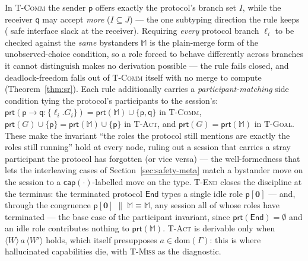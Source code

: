 \documentclass{article}
\theoremstyle{plain}
\theoremstyle{definition}
\newcommand{\dom}{\mathrm{dom}}
\newcommand{\MM}{\mathbb{M}}
\newcommand{\ppar}{\;\|\;}
\newcommand{\cp}[1]{\mathsf{cap}(#1)}
\newcommand{\prt}[1]{\mathsf{prt}(#1)}
\newcommand{\set}[1]{\{#1\}}
\newcommand{\End}{\mathsf{End}}
\begin{document}
In \textsc{T-Comm} the sender $\mathsf p$ offers exactly
the protocol's branch set $I$, while the receiver $\mathsf q$ may accept
\emph{more} ($I\subseteq J$) --- the one subtyping direction the rule keeps
(%
safe interface slack at the receiver). Requiring \emph{every}
protocol branch $\ell_i$ to be checked against the \emph{same} bystanders $\MM$
is the plain-merge form of the unobserved-choice condition, so a role forced to behave
differently across branches it cannot distinguish makes no derivation possible
--- the rule fails closed, and deadlock-freedom falls out of \textsc{T-Comm}
itself with no merge to compute (Theorem~\ref{thm:sr}). Each rule additionally
carries a \emph{participant-matching} side condition tying the protocol's
participants to the session's: $\prt{\mathsf p{\to}\mathsf q:\{\ell_i.G_i\}}
=\prt\MM\cup\set{\mathsf p,\mathsf q}$ in \textsc{T-Comm},
$\prt G\cup\set{\mathsf p}=\prt\MM\cup\set{\mathsf p}$ in \textsc{T-Act}, and
$\prt G=\prt\MM$ in \textsc{T-Goal}. These make the invariant ``the roles the
protocol still mentions are exactly the roles still running'' hold at every node,
ruling out a session that carries a stray participant the protocol has forgotten
(or vice versa) --- the well-formedness that lets the interleaving cases of
Section~\ref{sec:safety-meta}
match a bystander move on the session to a $\cp{\cdot}$-labelled move on the type.
\textsc{T-End} closes the discipline at the terminus: the terminated protocol
$\End$ types a single idle role $\mathsf p[\mathbf 0]$ --- and, through the
congruence $\mathsf p[\mathbf 0]\ppar\MM\equiv\MM$, any session all of whose
roles have terminated --- the base case of the participant invariant, since
$\prt\End=\emptyset$ and an idle role contributes nothing to $\prt\MM$.
\textsc{T-Act} is derivable only when $\langle W\rangle\,a\,\langle W'\rangle$
holds, which itself presupposes $a\in\dom(\Gamma)$: this is where hallucinated
capabilities die, with \textsc{T-Miss} as the diagnostic.
\end{document}
